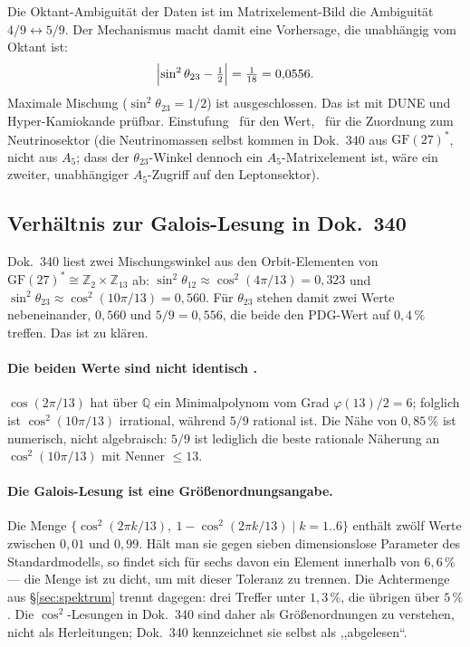 Die Oktant-Ambiguität der Daten ist im Matrixelement-Bild die Ambiguität
$4/9\leftrightarrow 5/9$. Der Mechanismus macht damit eine Vorhersage, die
unabhängig vom Oktant ist:
\[
  \Bigl|\sin^2\theta_{23} - \tfrac12\Bigr| = \tfrac1{18} = 0{,}0556 .
\]
Maximale Mischung ($\sin^2\theta_{23} = 1/2$) ist ausgeschlossen. Das ist
mit DUNE und Hyper-Kamiokande prüfbar. Einstufung \KM~für den Wert,
\SM~für die Zuordnung zum Neutrinosektor (die Neutrinomassen selbst kommen
in Dok.~340 aus $\mathrm{GF}(27)^*$, nicht aus $A_5$; dass der
$\theta_{23}$-Winkel dennoch ein $A_5$-Matrixelement ist, wäre ein zweiter,
unabhängiger $A_5$-Zugriff auf den Leptonsektor).

\subsection{Verhältnis zur Galois-Lesung in Dok.~340}
\label{sec:340}

Dok.~340 liest zwei Mischungswinkel aus den Orbit-Elementen von
$\mathrm{GF}(27)^*\cong\mathbb Z_2\times\mathbb Z_{13}$ ab:
$\sin^2\theta_{12}\approx\cos^2(4\pi/13) = 0{,}323$ und
$\sin^2\theta_{23}\approx\cos^2(10\pi/13) = 0{,}560$. Für $\theta_{23}$
stehen damit zwei Werte nebeneinander, $0{,}560$ und $5/9 = 0{,}556$, die
beide den PDG-Wert auf $0{,}4\,\%$ treffen. Das ist zu klären.

\paragraph{Die beiden Werte sind nicht identisch \BM.}
$\cos(2\pi/13)$ hat über $\mathbb Q$ ein Minimalpolynom vom Grad
$\varphi(13)/2 = 6$; folglich ist $\cos^2(10\pi/13)$ irrational, während
$5/9$ rational ist. Die Nähe von $0{,}85\,\%$ ist numerisch, nicht
algebraisch: $5/9$ ist lediglich die beste rationale Näherung an
$\cos^2(10\pi/13)$ mit Nenner $\le 13$.

\paragraph{Die Galois-Lesung ist eine Größenordnungsangabe.}
Die Menge $\{\cos^2(2\pi k/13),\ 1-\cos^2(2\pi k/13)\mid k=1..6\}$ enthält
zwölf Werte zwischen $0{,}01$ und $0{,}99$. Hält man sie gegen sieben
dimensionslose Parameter des Standardmodells, so findet sich für sechs davon
ein Element innerhalb von $6{,}6\,\%$ --- die Menge ist zu dicht, um mit
dieser Toleranz zu trennen. Die Achtermenge aus §\ref{sec:spektrum} trennt
dagegen: drei Treffer unter $1{,}3\,\%$, die übrigen über $5\,\%$.
Die $\cos^2$-Lesungen in Dok.~340 sind daher als Größenordnungen zu
verstehen, nicht als Herleitungen; Dok.~340 kennzeichnet sie selbst als
,,abgelesen``.

